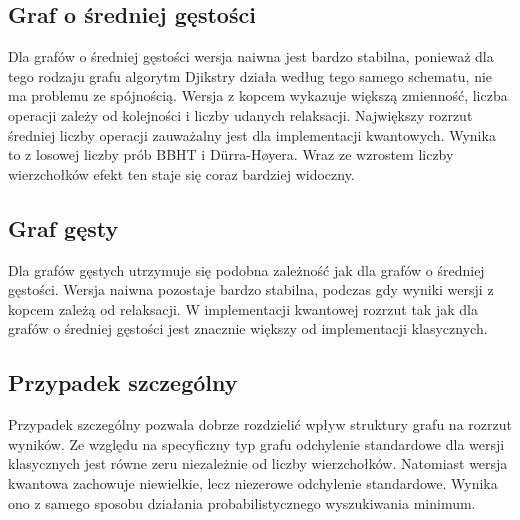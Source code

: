 \subsection{Graf o średniej gęstości}

Dla grafów o średniej gęstości wersja naiwna jest bardzo stabilna, ponieważ dla tego rodzaju grafu algorytm Djikstry działa według tego samego schematu, nie ma problemu ze spójnością. Wersja z kopcem wykazuje większą zmienność, liczba operacji zależy od kolejności i liczby udanych relaksacji. Największy rozrzut średniej liczby operacji zauważalny jest dla implementacji kwantowych. Wynika to z losowej liczby prób BBHT i Dürra-Høyera. Wraz ze wzrostem liczby wierzchołków efekt ten staje się coraz bardziej widoczny.

\subsection{Graf gęsty}

Dla grafów gęstych utrzymuje się podobna zależność jak dla grafów o średniej gęstości. Wersja naiwna pozostaje bardzo stabilna, podczas gdy wyniki wersji z kopcem zależą od relaksacji. W implementacji kwantowej rozrzut tak jak dla grafów o średniej gęstości jest znacznie większy od implementacji klasycznych.

\subsection{Przypadek szczególny}

Przypadek szczególny pozwala dobrze rozdzielić wpływ struktury grafu na rozrzut wyników. Ze względu na specyficzny typ grafu odchylenie standardowe dla wersji klasycznych jest równe zeru niezależnie od liczby wierzchołków. Natomiast wersja kwantowa zachowuje niewielkie, lecz niezerowe odchylenie standardowe. Wynika ono z samego sposobu działania probabilistycznego wyszukiwania minimum. 
